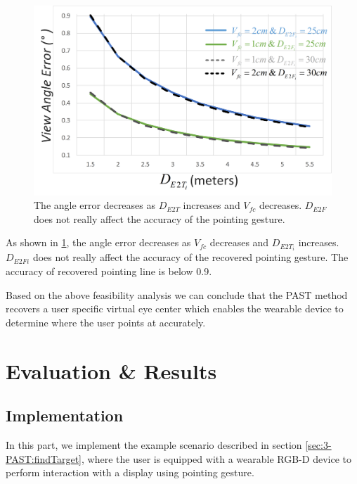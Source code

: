 \begin{figure} [htb]
	\centering
	\includegraphics[width= \linewidth]{figures/3-PAST/EvaluationOfPointing.png}
	\caption{The angle error decreases as $D_{E2T}$ increases and $V_{fc}$ decreases. $D_{E2F}$ does not really affect the accuracy of the pointing gesture.}
	\label{fig:3-PAST:evaluatinOfPointing}
\end{figure}
As shown in \figurename{ \ref{fig:3-PAST:evaluatinOfPointing}}, the angle error decreases as $V_{fc}$ decreases and $D_{E2T_i}$ increases. $D_{E2Fi}$ does not really affect the accuracy of the recovered pointing gesture. The accuracy of recovered pointing line is below 0.9\degree.

Based on the above feasibility analysis we can conclude that the PAST method recovers a user specific virtual eye center which enables the wearable device to determine where the user points at accurately.

\section{Evaluation \& Results}
\subsection{Implementation}
In this part, we implement the example scenario described in section \ref{sec:3-PAST:findTarget}, where the user is equipped with a wearable RGB-D device to perform interaction with a display using pointing gesture.
